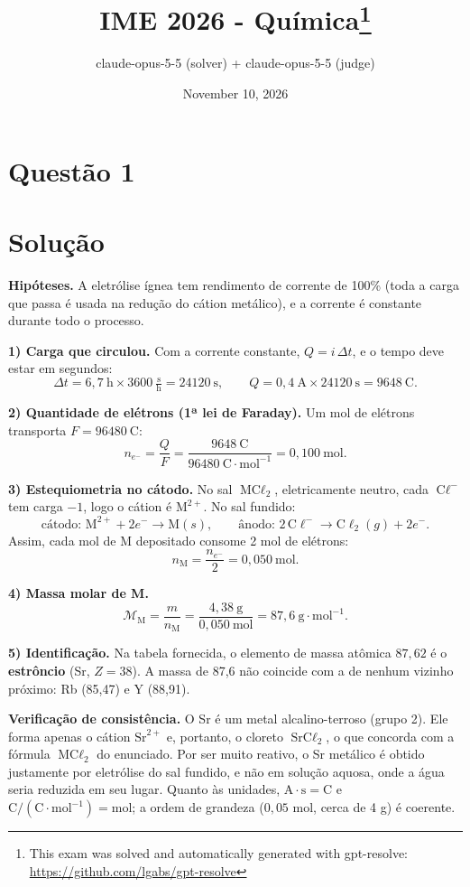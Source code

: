 \documentclass{article}%
\title{IME 2026 - Química\thanks{This exam was solved and automatically generated with gpt-resolve: \url{https://github.com/lgabs/gpt-resolve}}}%
\author{claude{-}opus{-}5{-}5 (solver) + claude{-}opus{-}5{-}5 (judge)}%
\date{November 10, 2026}%
\begin{document}
%
\normalsize%
\maketitle%
\section*{Questão 1}

\section*{Solução}

\textbf{Hipóteses.} A eletrólise ígnea tem rendimento de corrente de 100\% (toda a carga que passa é usada na redução do cátion metálico), e a corrente é constante durante todo o processo.

\textbf{1) Carga que circulou.} Com a corrente constante, $Q = i\,\Delta t$, e o tempo deve estar em segundos:
\[
\Delta t = 6{,}7\ \text{h}\times 3600\ \tfrac{\text{s}}{\text{h}} = 24120\ \text{s},
\qquad
Q = 0{,}4\ \text{A}\times 24120\ \text{s} = 9648\ \text{C}.
\]

\textbf{2) Quantidade de elétrons (1ª lei de Faraday).} Um mol de elétrons transporta $F = 96480\ \text{C}$:
\[
n_{e^-} = \frac{Q}{F} = \frac{9648\ \text{C}}{96480\ \text{C}\cdot\text{mol}^{-1}} = 0{,}100\ \text{mol}.
\]

\textbf{3) Estequiometria no cátodo.} No sal $\text{MC}\ell_2$, eletricamente neutro, cada $\text{C}\ell^-$ tem carga $-1$, logo o cátion é $\text{M}^{2+}$. No sal fundido:
\[
\text{cátodo: } \text{M}^{2+} + 2e^- \longrightarrow \text{M}(s), \qquad
\text{ânodo: } 2\,\text{C}\ell^- \longrightarrow \text{C}\ell_2(g) + 2e^-.
\]
Assim, cada mol de M depositado consome 2 mol de elétrons:
\[
n_{\text{M}} = \frac{n_{e^-}}{2} = 0{,}050\ \text{mol}.
\]

\textbf{4) Massa molar de M.}
\[
\mathcal{M}_{\text{M}} = \frac{m}{n_{\text{M}}} = \frac{4{,}38\ \text{g}}{0{,}050\ \text{mol}} = 87{,}6\ \text{g}\cdot\text{mol}^{-1}.
\]

\textbf{5) Identificação.} Na tabela fornecida, o elemento de massa atômica $87{,}62$ é o \textbf{estrôncio} (Sr, $Z = 38$). A massa de 87{,}6 não coincide com a de nenhum vizinho próximo: Rb (85{,}47) e Y (88{,}91).

\textbf{Verificação de consistência.} O Sr é um metal alcalino-terroso (grupo 2). Ele forma apenas o cátion $\text{Sr}^{2+}$ e, portanto, o cloreto $\text{SrC}\ell_2$, o que concorda com a fórmula $\text{MC}\ell_2$ do enunciado. Por ser muito reativo, o Sr metálico é obtido justamente por eletrólise do sal fundido, e não em solução aquosa, onde a água seria reduzida em seu lugar. Quanto às unidades, $\text{A}\cdot\text{s} = \text{C}$ e $\text{C}/(\text{C}\cdot\text{mol}^{-1}) = \text{mol}$; a ordem de grandeza ($0{,}05$ mol, cerca de 4 g) é coerente.
\end{document}
